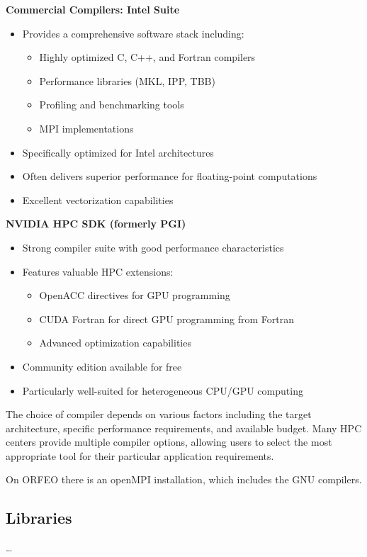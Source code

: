 \textbf{Commercial Compilers: Intel Suite}
\begin{itemize}
    \item Provides a comprehensive software stack including:
    \begin{itemize}
        \item Highly optimized C, C++, and Fortran compilers
        \item Performance libraries (MKL, IPP, TBB)
        \item Profiling and benchmarking tools
        \item MPI implementations
    \end{itemize}
    \item Specifically optimized for Intel architectures
    \item Often delivers superior performance for floating-point computations
    \item Excellent vectorization capabilities
\end{itemize}

\textbf{NVIDIA HPC SDK (formerly PGI)}
\begin{itemize}
    \item Strong compiler suite with good performance characteristics
    \item Features valuable HPC extensions:
    \begin{itemize}
        \item OpenACC directives for GPU programming
        \item CUDA Fortran for direct GPU programming from Fortran
        \item Advanced optimization capabilities
    \end{itemize}
    \item Community edition available for free
    \item Particularly well-suited for heterogeneous CPU/GPU computing
\end{itemize}

The choice of compiler depends on various factors including the target architecture, specific performance requirements, and available budget. Many HPC centers provide multiple compiler options, allowing users to select the most appropriate tool for their particular application requirements.

\begin{observationblock}
    On ORFEO there is an openMPI installation, which includes the GNU compilers.
\end{observationblock}

\subsection{Libraries}

\dots
